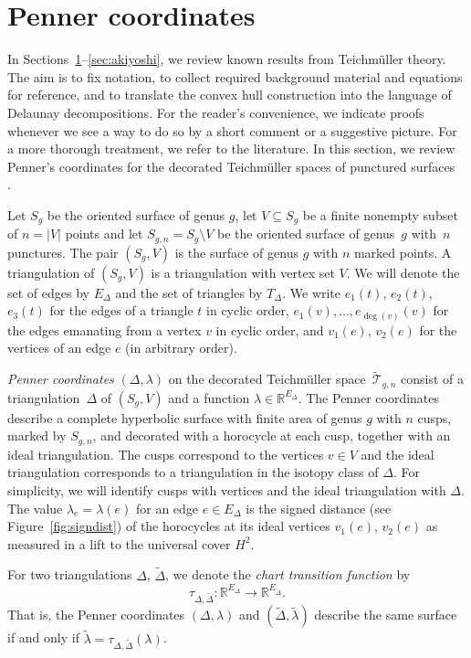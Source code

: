 \documentclass[a4paper, 11pt]{article}
\newcommand{\R}{\mathbb{R}}
\newcommand{\Teich}{\mathcal{T}}
\newcommand{\decTeich}{\widetilde{\Teich}}
\newcommand{\Tm}{Teich\-m{\"u}l\-ler}
\newcommand{\Deltil}{\widetilde{\Delta}}
\newcommand{\lamtil}{\tilde{\lambda}}
\theoremstyle{plain}
\theoremstyle{definition}
\begin{document}
\section{Penner coordinates}
\label{sec:penner}

In Sections~\ref{sec:penner}--\ref{sec:akiyoshi}, we review known
results from {\Tm} theory. The aim is to fix notation, to collect
required background material and equations for reference, and to
translate the convex hull construction into the language of Delaunay
decompositions. For the reader's convenience, we indicate proofs
whenever we see a way to do so by a short comment or a suggestive
picture. For a more thorough treatment, we refer to the literature. In
this section, we review Penner's coordinates for the decorated {\Tm}
spaces of punctured surfaces~\cite{penner87} \cite{penner12}.

Let $S_{g}$ be the oriented surface of genus $g$, let
$V\subseteq S_{g}$ be a finite nonempty subset of $n=|V|$ points and
let $S_{g,n}=S_{g}\setminus V$ be the oriented surface of genus~$g$
with~$n$ punctures. The pair $(S_{g},V)$ is the surface of genus $g$
with $n$ marked points. A triangulation of $(S_{g},V)$ is a
triangulation with vertex set $V$. We will denote the set of edges by
$E_{\Delta}$ and the set of triangles by $T_{\Delta}$. We write
$e_{1}(t)$, $e_{2}(t)$, $e_{3}(t)$ for the edges of a triangle $t$ in
cyclic order, $e_{1}(v),\ldots,e_{\deg(v)}(v)$ for the edges emanating
from a vertex $v$ in cyclic order, and $v_{1}(e)$, $v_{2}(e)$ for the
vertices of an edge $e$ (in arbitrary order).

\emph{Penner coordinates} $(\Delta,\lambda)$ on the decorated
{\Tm} space~$\decTeich_{g,n}$ consist of a
triangulation~$\Delta$ of $(S_{g},V)$ and a function
$\lambda\in\R^{E_{\Delta}}$. The Penner coordinates describe a
complete hyperbolic surface with finite area of genus $g$ with $n$
cusps, marked by $S_{g,n}$, and decorated with a horocycle at each cusp,
together with an ideal triangulation. The cusps correspond to the
vertices $v\in V$ and the ideal triangulation corresponds to a
triangulation in the isotopy class of $\Delta$.  For simplicity, we
will identify cusps with vertices and the ideal triangulation with
$\Delta$.  The value $\lambda_{e}=\lambda(e)$ for an edge
$e\in E_{\Delta}$ is the signed distance (see Figure~\ref{fig:signdist})
of the horocycles at its ideal vertices $v_{1}(e)$, $v_{2}(e)$ as
measured in a lift to the universal cover $H^{2}$.

For two triangulations $\Delta$, $\Deltil$, we denote the \emph{chart
  transition function} 
by
\begin{equation}
  \label{eq:tau}
  \tau_{\Delta,\Deltil}:\R^{E_{\Delta}}\rightarrow\R^{E_{\Deltil}}.
\end{equation}
That is, the Penner coordinates $(\Delta,\lambda)$ and
$(\Deltil,\lamtil)$ describe the same surface if and only if
$\lamtil=\tau_{\Delta,\Deltil}(\lambda)$.
\end{document}
